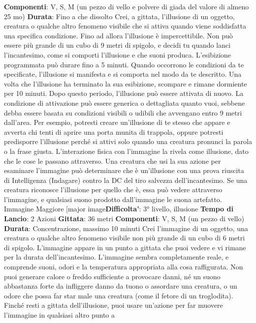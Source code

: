 \begin{multicols}{2}
\textbf{Componenti}: V, S, M (un pezzo di vello e polvere di
giada del valore di almeno 25 mo)
\textbf{Durata}: Fino a che dissolto
Crei, a gittata, l’illusione di un oggetto, creatura o
qualche altro fenomeno visibile che si attiva quando
viene soddisfatta una specifica condizione. Fino ad
allora l’illusione è impercettibile. Non può essere più
grande di un cubo di 9 metri di spigolo, e decidi tu
quando lanci l’incantesimo, come si comporti l’illusione
e che suoni produca. L’esibizione programmata può
durare fino a 5 minuti.
Quando occorrono le condizioni da te specificate,
l’illusione si manifesta e si comporta nel modo da te
descritto. Una volta che l’illusione ha terminato la sua
esibizione, scompare e rimane dormiente per 10 minuti.
Dopo questo periodo, l’illusione può essere attivata di
nuovo.
La condizione di attivazione può essere generica o
dettagliata quanto vuoi, sebbene debba essere basata
su condizioni visibili o udibili che avvengano entro 9
metri dall’area. Per esempio, potresti creare un’illusione
di te stesso che appare e avverta chi tenti di aprire una
porta munita di trappola, oppure potresti predisporre
l’illusione perché si attivi solo quando una creatura
pronunci la parola o la frase giusta.
L’interazione fisica con l’immagine la rivela come
illusione, dato che le cose le passano attraverso. Una
creatura che usi la sua azione per esaminare
l’immagine può determinare che è un’illusione con una
prova riuscita di Intelligenza (Indagare) contro la DC del
tiro salvezza dell’incantesimo. Se una creatura
riconosce l’illusione per quello che è, essa può vedere
attraverso l’immagine, e qualsiasi suono prodotto
dall’immagine le suona artefatto.
Immagine Maggiore
[major image\textbf{Difficolta'}:
3° livello, illusione
\textbf{Tempo di Lancio}: 2 Azioni
\textbf{Gittata}: 36 metri
\textbf{Componenti}: V, S, M (un pezzo di vello)
\textbf{Durata}: Concentrazione, massimo 10 minuti
Crei l’immagine di un oggetto, una creatura o qualche
altro fenomeno visibile non più grande di un cubo di 6
metri di spigolo. L’immagine appare in un punto a
gittata che puoi vedere e vi rimane per la durata
dell’incantesimo. L’immagine sembra completamente
reale, e comprende suoni, odori e la temperatura
appropriata alla cosa raffigurata. Non puoi generare
calore o freddo sufficiente a provocare danni, né un
suono abbastanza forte da infliggere danno da tuono o
assordare una creatura, o un odore che possa far star
male una creatura (come il fetore di un troglodita).
Finché resti a gittata dell’illusione, puoi usare un’azione
per far muovere l’immagine in qualsiasi altro punto a

\end{multicols}
